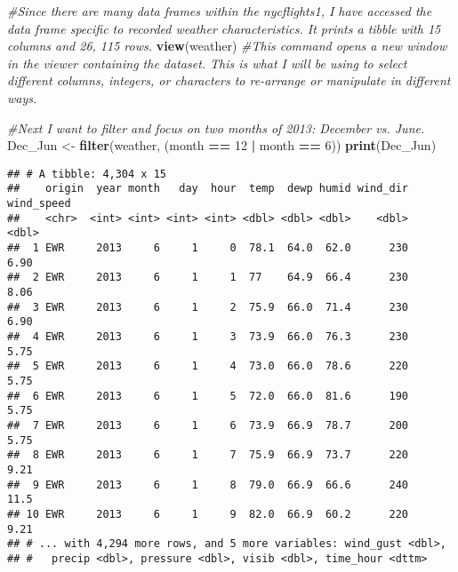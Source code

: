 \documentclass[
]{article}
\newenvironment{Shaded}{\begin{snugshade}}{\end{snugshade}}
\newcommand{\CommentTok}[1]{\textcolor[rgb]{0.56,0.35,0.01}{\textit{#1}}}
\newcommand{\DecValTok}[1]{\textcolor[rgb]{0.00,0.00,0.81}{#1}}
\newcommand{\KeywordTok}[1]{\textcolor[rgb]{0.13,0.29,0.53}{\textbf{#1}}}
\newcommand{\NormalTok}[1]{#1}
\newcommand{\OperatorTok}[1]{\textcolor[rgb]{0.81,0.36,0.00}{\textbf{#1}}}
\newcommand{\StringTok}[1]{\textcolor[rgb]{0.31,0.60,0.02}{#1}}
\begin{document}
\begin{Shaded}
\begin{Highlighting}[]
\CommentTok{#Since there are many data frames within the nycflights1, I have accessed the data frame specific to recorded weather characteristics. It prints a tibble with 15 columns and 26, 115 rows. }
\KeywordTok{view}\NormalTok{(weather) }
\CommentTok{#This command opens a new window in the viewer containing the dataset. This is what I will be using to select different columns, integers, or characters to re-arrange or manipulate in different ways. }

\CommentTok{#Next I want to filter and focus on two months of 2013: December vs. June. }
\NormalTok{Dec_Jun <-}\StringTok{ }\KeywordTok{filter}\NormalTok{(weather, (month }\OperatorTok{==}\StringTok{ }\DecValTok{12} \OperatorTok{|}\StringTok{ }\NormalTok{month }\OperatorTok{==}\StringTok{ }\DecValTok{6}\NormalTok{))}
\KeywordTok{print}\NormalTok{(Dec_Jun)}
\end{Highlighting}
\end{Shaded}

\begin{verbatim}
## # A tibble: 4,304 x 15
##    origin  year month   day  hour  temp  dewp humid wind_dir wind_speed
##    <chr>  <int> <int> <int> <int> <dbl> <dbl> <dbl>    <dbl>      <dbl>
##  1 EWR     2013     6     1     0  78.1  64.0  62.0      230       6.90
##  2 EWR     2013     6     1     1  77    64.9  66.4      230       8.06
##  3 EWR     2013     6     1     2  75.9  66.0  71.4      230       6.90
##  4 EWR     2013     6     1     3  73.9  66.0  76.3      230       5.75
##  5 EWR     2013     6     1     4  73.0  66.0  78.6      220       5.75
##  6 EWR     2013     6     1     5  72.0  66.0  81.6      190       5.75
##  7 EWR     2013     6     1     6  73.9  66.9  78.7      200       5.75
##  8 EWR     2013     6     1     7  75.9  66.9  73.7      220       9.21
##  9 EWR     2013     6     1     8  79.0  66.9  66.6      240      11.5 
## 10 EWR     2013     6     1     9  82.0  66.9  60.2      220       9.21
## # ... with 4,294 more rows, and 5 more variables: wind_gust <dbl>,
## #   precip <dbl>, pressure <dbl>, visib <dbl>, time_hour <dttm>
\end{verbatim}

\begin{Shaded}
\end{Shaded}
\end{document}
